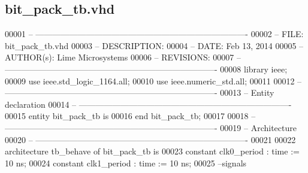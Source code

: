 \subsection{bit\+\_\+pack\+\_\+tb.\+vhd}
\label{rx__path__top_2bit__pack_2sim_2bit__pack__tb_8vhd_source}

\begin{DoxyCode}
00001 \textcolor{keyword}{-- ---------------------------------------------------------------------------- }
00002 \textcolor{keyword}{-- FILE:    bit\_pack\_tb.vhd}
00003 \textcolor{keyword}{-- DESCRIPTION: }
00004 \textcolor{keyword}{-- DATE:    Feb 13, 2014}
00005 \textcolor{keyword}{-- AUTHOR(s):   Lime Microsystems}
00006 \textcolor{keyword}{-- REVISIONS:}
00007 \textcolor{keyword}{-- ---------------------------------------------------------------------------- }
00008 \textcolor{vhdlkeyword}{library }\textcolor{keywordflow}{ieee};
00009 \textcolor{vhdlkeyword}{use }ieee.std\_logic\_1164.\textcolor{keywordflow}{all};
00010 \textcolor{vhdlkeyword}{use }ieee.numeric\_std.\textcolor{keywordflow}{all};
00011 
00012 \textcolor{keyword}{-- ----------------------------------------------------------------------------}
00013 \textcolor{keyword}{-- Entity declaration}
00014 \textcolor{keyword}{-- ----------------------------------------------------------------------------}
00015 \textcolor{keywordflow}{entity }bit_pack_tb \textcolor{keywordflow}{is}
00016 \textcolor{keywordflow}{end} \textcolor{vhdlchar}{bit\_pack\_tb};
00017 
00018 \textcolor{keyword}{-- ----------------------------------------------------------------------------}
00019 \textcolor{keyword}{-- Architecture}
00020 \textcolor{keyword}{-- ----------------------------------------------------------------------------}
00021 
00022 \textcolor{keywordflow}{architecture} tb\_behave \textcolor{keywordflow}{of} bit_pack_tb is
00023    \textcolor{keywordflow}{constant} \textcolor{vhdlchar}{clk0_period}    \textcolor{vhdlchar}{:} \textcolor{comment}{time} \textcolor{vhdlchar}{:=} \textcolor{vhdllogic}{}\textcolor{vhdllogic}{10} \textcolor{vhdlchar}{ns};
00024    \textcolor{keywordflow}{constant} \textcolor{vhdlchar}{clk1_period}    \textcolor{vhdlchar}{:} \textcolor{comment}{time} \textcolor{vhdlchar}{:=} \textcolor{vhdllogic}{}\textcolor{vhdllogic}{10} \textcolor{vhdlchar}{ns}; 
00025 \textcolor{keyword}{   --signals}

\end{DoxyCode}
